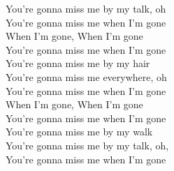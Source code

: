 You're gonna miss me by my talk, oh\\
You're gonna miss me when I'm gone\\
When I'm gone, When I'm gone\\
You're gonna miss me when I'm gone\\
You're gonna miss me by my hair\\
You're gonna miss me everywhere, oh\\
You're gonna miss me when I'm gone\\
When I'm gone, When I'm gone\\
You're gonna miss me when I'm gone\\
You're gonna miss me by my walk\\
You're gonna miss me by my talk, oh, \\
You're gonna miss me when I'm gone

